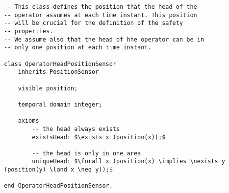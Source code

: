\begin{lstlisting}[fontadjust, mathescape, frame=single] 
-- This class defines the position that the head of the
-- operator assumes at each time instant. This position
-- will be crucial for the definition of the safety 
-- properties. 
-- We assume also that the head of hhe operator can be in
-- only one position at each time instant.

class OperatorHeadPositionSensor
    inherits PositionSensor
    
    visible position;

    temporal domain integer;

    axioms
        -- the head always exists
        existsHead: $\exists x (position(x));$

        -- the head is only in one area
        uniqueHead: $\forall x (position(x) \implies \nexists y (position(y) \land x \neq y));$

end OperatorHeadPositionSensor.
\end{lstlisting}